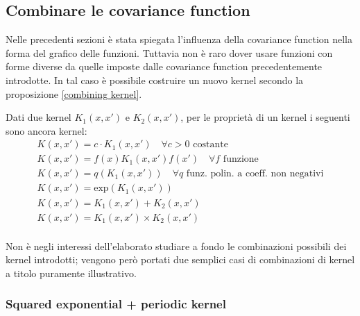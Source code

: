 \newpage

\subsection{Combinare le covariance function}
Nelle precedenti sezioni è stata spiegata l'influenza della covariance function nella forma del grafico delle funzioni. Tuttavia non è raro dover usare funzioni con forme diverse da quelle imposte dalle covariance function precedentemente introdotte. In tal caso è possibile costruire un nuovo kernel secondo la proposizione \ref{combining kernel}.


\begin{prop} \label{combining kernel}
Dati due kernel $K_1(x,x')$ e $K_2(x,x')$, per le proprietà di un kernel i seguenti sono ancora kernel:
\[
\begin{array}{l}
    K(x,x') = c\cdot K_1(x,x') \quad \forall c>0 \text{ costante}\\
    K(x,x') = f(x)K_1(x,x')f(x') \quad \forall f \text{ funzione}\\
    K(x,x') = q(K_1(x,x')) \quad \forall q \text{ funz. polin. a coeff. non negativi}\\
    K(x,x') = \text{exp}(K_1(x,x'))\\
    K(x,x') = K_1(x,x')+K_2(x,x')\\
    K(x,x') = K_1(x,x')\times K_2(x,x')\\
\end{array}
\]
\end{prop}
Non è negli interessi dell'elaborato studiare a fondo le combinazioni possibili dei kernel introdotti; vengono però portati due semplici casi di combinazioni di kernel a titolo puramente illustrativo.

\newpage




\subsubsection{Squared exponential + periodic kernel}


